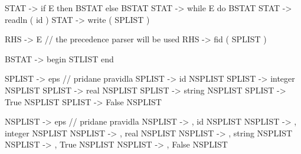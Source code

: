 \documentclass[a4paper, 11pt]{article}
\begin{document}
  STAT -> if E then BSTAT else BSTAT
  STAT -> while E do BSTAT
  STAT -> readln ( id )
  STAT -> write ( SPLIST )
  
  RHS -> E                              // the precedence parser will be used
  RHS -> fid ( SPLIST )

  BSTAT -> begin STLIST end

  SPLIST -> eps                      // pridane pravidla
  SPLIST -> id NSPLIST
  SPLIST -> integer NSPLIST
  SPLIST -> real NSPLIST
  SPLIST -> string NSPLIST
  SPLIST -> True NSPLIST
  SPLIST -> False NSPLIST


  NSPLIST -> eps                      // pridane pravidla
  NSPLIST -> , id NSPLIST
  NSPLIST -> , integer NSPLIST
  NSPLIST -> , real NSPLIST
  NSPLIST -> , string NSPLIST
  NSPLIST -> , True NSPLIST
  NSPLIST -> , False NSPLIST

\newpage
\end{document}
